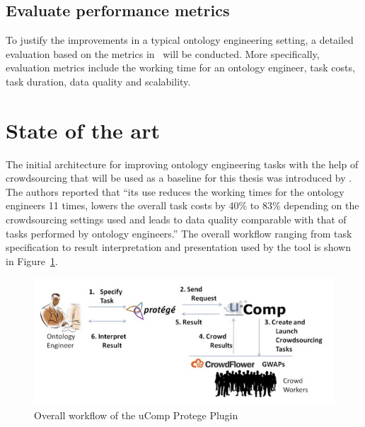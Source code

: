 \documentclass[12pt, notitlepage]{article}
\begin{document}
\subsection{Evaluate performance metrics}
To justify the improvements in a typical ontology engineering setting, a detailed evaluation based on the metrics in~\cite{wohlgenannt2016crowd} will be conducted. More specifically, evaluation metrics include the working time for an ontology engineer, task costs, task duration, data quality and scalability.  

\section{State of the art}

The initial architecture for improving ontology engineering tasks with the help of crowdsourcing that will be used as a baseline for this thesis was introduced by \citet{wohlgenannt2016crowd}. The authors reported that \enquote{its use reduces the working times for the ontology engineers 11 times, lowers the overall task costs by 40\% to 83\% depending on the crowdsourcing settings used and leads to data quality comparable with that of tasks performed by ontology engineers.} The overall workflow ranging from task specification to result interpretation and presentation used by the tool is shown in Figure~\ref{fig:ucomp_workflow}.
\begin{figure}[H]
	 \includegraphics[width=\textwidth]{graphics/ucomp_workflow}
	 \caption{Overall workflow of the uComp Protege Plugin~\cite{wohlgenannt2016crowd}}\label{fig:ucomp_workflow}
\end{figure}
\end{document}

